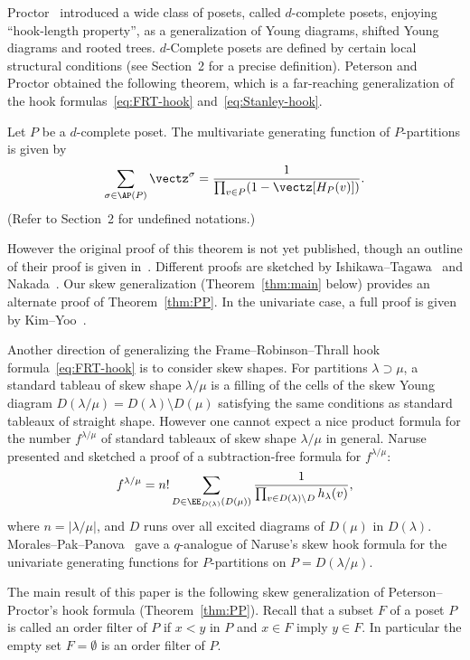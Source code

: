 Proctor~\cite{Proc1, Proc2} introduced a wide class of posets, 
called $d$-complete posets, enjoying ``hook-length property'', 
as a generalization of Young diagrams, shifted Young diagrams and rooted trees.
$d$-Complete posets are defined by certain local structural conditions 
(see Section~2 for a precise definition).
Peterson and Proctor obtained the following theorem, which is a far-reaching generalization 
of the hook formulas~\eqref{eq:FRT-hook} and~\eqref{eq:Stanley-hook}.

\begin{theo}
\label{thm:PP}
Let $P$ be a $d$-complete poset.
The multivari\-ate generating function of $P$-partitions is given by
\begin{equation}
\label{eq:PP-hook}
\sum_{\sigma \in \AP(P)} \vectz^{\sigma}
 =
\frac{ 1 }
 { \prod_{v \in P} (1 - \vectz[H_P(v)]) }.
\end{equation}
(Refer to Section~2 for undefined notations.)
\end{theo}

However the original proof of this theorem is not yet published, 
though an outline of their proof is given in~\cite{Proc3}.
Different proofs are sketched by Ishikawa--Tagawa~\cite{IT1, IT2} and Nakada~\cite{N3, N2}.
Our skew generalization (Theorem~\ref{thm:main} below) provides an alternate proof of Theorem~\ref{thm:PP}.
In the univariate case, a full proof is given by Kim--Yoo~\cite{KY}.

Another direction of generalizing the Frame--Robinson--Thrall hook formula~\eqref{eq:FRT-hook} 
is to consider skew shapes.
For partitions $\lambda \supset \mu$, 
a standard tableau of skew shape $\lambda/\mu$ is a filling of the cells of the skew Young diagram 
$D(\lambda/\mu) = D(\lambda) \setminus D(\mu)$ satisfying the same conditions as standard tableaux 
of straight shape.
However one cannot expect a nice product formula for the number $f^{\lambda/\mu}$ of 
standard tableaux of skew shape $\lambda/\mu$ in general.
Naruse~\cite{Naruse} presented and sketched a proof of a subtraction-free formula for $f^{\lambda/\mu}$:
\begin{equation}
\label{eq:Naruse-hook}
f^{\lambda/\mu}
 =
n!
\sum_{D \in \EE_{D(\lambda)}(D(\mu))} 
 \frac{ 1 }
 { \prod_{v \in D(\lambda) \setminus D} h_\lambda(v) },
\end{equation}
where $n = |\lambda/\mu|$, 
and $D$ runs over all excited diagrams of $D(\mu)$ in $D(\lambda)$.
Morales--Pak--Panova~\cite{MPP} gave a $q$-analogue of Naruse's skew hook formula 
for the univariate generating functions for $P$-partitions on $P = D(\lambda/\mu)$.

The main result of this paper is the following skew generalization of Peterson--Proctor's 
hook formula (Theorem~\ref{thm:PP}).
Recall that a subset $F$ of a poset $P$ is called an order filter of $P$ if 
$x<y$ in $P$ and $x \in F$ imply $y \in F$.
In particular the empty set $F = \emptyset$ is an order filter of $P$.
